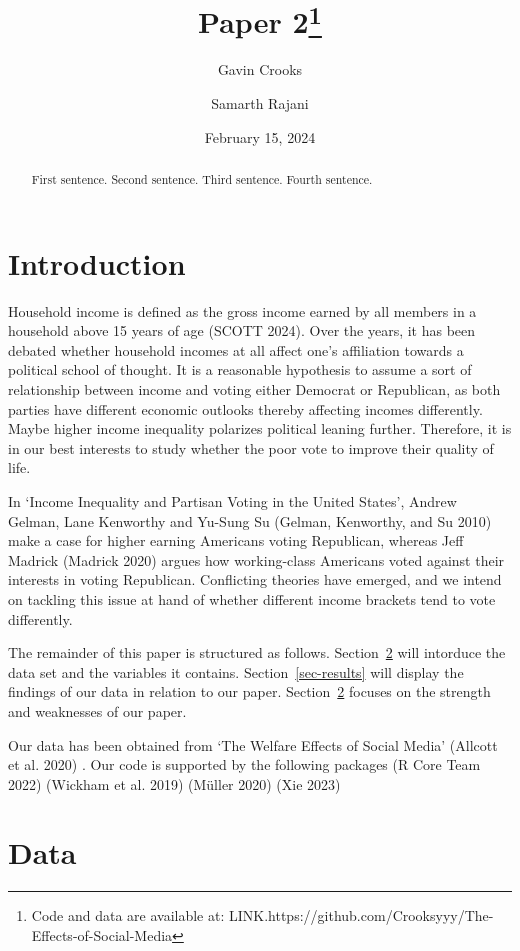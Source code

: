 \documentclass[
  letterpaper,
  DIV=11,
  numbers=noendperiod]{scrartcl}
\title{Paper 2\thanks{Code and data are available at:
LINK.https://github.com/Crooksyyy/The-Effects-of-Social-Media}}
\author{Gavin Crooks \and Samarth Rajani}
\date{February 15, 2024}
\renewcommand*\contentsname{Table of contents}
\newcommand\contentsname{Table of contents}
\begin{document}
\maketitle
\begin{abstract}
First sentence. Second sentence. Third sentence. Fourth sentence.
\end{abstract}

\renewcommand*\contentsname{Table of contents}
{
\hypersetup{linkcolor=}
\setcounter{tocdepth}{3}
\tableofcontents
}
\section{Introduction}\label{sec-intro}

Household income is defined as the gross income earned by all members in
a household above 15 years of age (SCOTT 2024). Over the years, it has
been debated whether household incomes at all affect one's affiliation
towards a political school of thought. It is a reasonable hypothesis to
assume a sort of relationship between income and voting either Democrat
or Republican, as both parties have different economic outlooks thereby
affecting incomes differently. Maybe higher income inequality polarizes
political leaning further. Therefore, it is in our best interests to
study whether the poor vote to improve their quality of life.

In `Income Inequality and Partisan Voting in the United States', Andrew
Gelman, Lane Kenworthy and Yu-Sung Su (Gelman, Kenworthy, and Su 2010)
make a case for higher earning Americans voting Republican, whereas Jeff
Madrick (Madrick 2020) argues how working-class Americans voted against
their interests in voting Republican. Conflicting theories have emerged,
and we intend on tackling this issue at hand of whether different income
brackets tend to vote differently.

The remainder of this paper is structured as follows.
Section~\ref{sec-data} will intorduce the data set and the variables it
contains. Section~\ref{sec-results} will display the findings of our
data in relation to our paper. Section~\ref{sec-data} focuses on the
strength and weaknesses of our paper.

Our data has been obtained from `The Welfare Effects of Social Media'
(Allcott et al. 2020) . Our code is supported by the following packages
(R Core Team 2022) (Wickham et al. 2019) (Müller 2020) (Xie 2023)

\section{Data}\label{sec-data}
\end{document}

